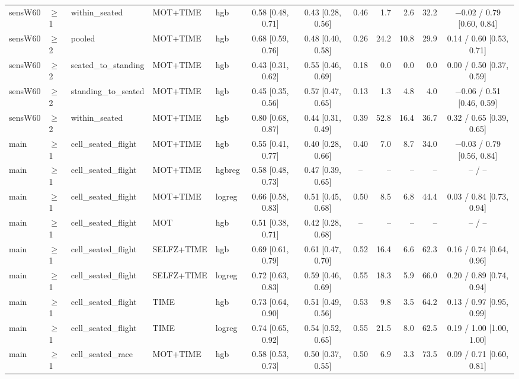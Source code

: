 \begin{longtable}{@{}lllllcccrrrc@{}}
sensW60 & $\geq$1 & within\_seated & MOT+TIME & hgb & 0.58 [0.48, 0.71] & 0.43 [0.28, 0.56] & 0.46 & 1.7 & 2.6 & 32.2 & $-$0.02 / 0.79 [0.60, 0.84] \\
sensW60 & $\geq$2 & pooled & MOT+TIME & hgb & 0.68 [0.59, 0.76] & 0.48 [0.40, 0.58] & 0.26 & 24.2 & 10.8 & 29.9 & 0.14 / 0.60 [0.53, 0.71] \\
sensW60 & $\geq$2 & seated\_to\_standing & MOT+TIME & hgb & 0.43 [0.31, 0.62] & 0.55 [0.46, 0.69] & 0.18 & 0.0 & 0.0 & 0.0 & 0.00 / 0.50 [0.37, 0.59] \\
sensW60 & $\geq$2 & standing\_to\_seated & MOT+TIME & hgb & 0.45 [0.35, 0.56] & 0.57 [0.47, 0.65] & 0.13 & 1.3 & 4.8 & 4.0 & $-$0.06 / 0.51 [0.46, 0.59] \\
sensW60 & $\geq$2 & within\_seated & MOT+TIME & hgb & 0.80 [0.68, 0.87] & 0.44 [0.31, 0.49] & 0.39 & 52.8 & 16.4 & 36.7 & 0.32 / 0.65 [0.39, 0.65] \\
main & $\geq$1 & cell\_seated\_flight & MOT+TIME & hgb & 0.55 [0.41, 0.77] & 0.40 [0.28, 0.66] & 0.40 & 7.0 & 8.7 & 34.0 & $-$0.03 / 0.79 [0.56, 0.84] \\
main & $\geq$1 & cell\_seated\_flight & MOT+TIME & hgbreg & 0.58 [0.48, 0.73] & 0.47 [0.39, 0.65] & -- & -- & -- & -- & -- / -- \\
main & $\geq$1 & cell\_seated\_flight & MOT+TIME & logreg & 0.66 [0.58, 0.83] & 0.51 [0.45, 0.68] & 0.50 & 8.5 & 6.8 & 44.4 & 0.03 / 0.84 [0.73, 0.94] \\
main & $\geq$1 & cell\_seated\_flight & MOT & hgb & 0.51 [0.38, 0.71] & 0.42 [0.28, 0.68] & -- & -- & -- & -- & -- / -- \\
main & $\geq$1 & cell\_seated\_flight & SELFZ+TIME & hgb & 0.69 [0.61, 0.79] & 0.61 [0.47, 0.70] & 0.52 & 16.4 & 6.6 & 62.3 & 0.16 / 0.74 [0.64, 0.96] \\
main & $\geq$1 & cell\_seated\_flight & SELFZ+TIME & logreg & 0.72 [0.63, 0.83] & 0.59 [0.46, 0.69] & 0.55 & 18.3 & 5.9 & 66.0 & 0.20 / 0.89 [0.74, 0.94] \\
main & $\geq$1 & cell\_seated\_flight & TIME & hgb & 0.73 [0.64, 0.90] & 0.51 [0.49, 0.56] & 0.53 & 9.8 & 3.5 & 64.2 & 0.13 / 0.97 [0.95, 0.99] \\
main & $\geq$1 & cell\_seated\_flight & TIME & logreg & 0.74 [0.65, 0.92] & 0.54 [0.52, 0.65] & 0.55 & 21.5 & 8.0 & 62.5 & 0.19 / 1.00 [1.00, 1.00] \\
main & $\geq$1 & cell\_seated\_race & MOT+TIME & hgb & 0.58 [0.53, 0.73] & 0.50 [0.37, 0.55] & 0.50 & 6.9 & 3.3 & 73.5 & 0.09 / 0.71 [0.60, 0.81] \\

\end{longtable}
